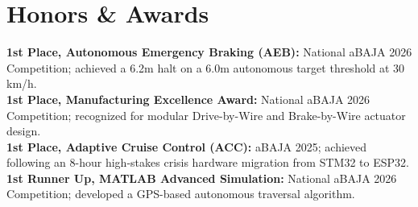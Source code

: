 \documentclass[letterpaper,9pt]{extarticle}
\newcommand{\resumeSubHeadingListStart}{\begin{itemize}[leftmargin=0.08in, label={}]}
\newcommand{\resumeSubHeadingListEnd}{\end{itemize}\vspace{-5pt}}
\begin{document}
\section{Honors \& Awards}
  \vspace{1pt}
  \resumeSubHeadingListStart
    \small{\item{
        \textbf{1st Place, Autonomous Emergency Braking (AEB):}{ National aBAJA 2026 Competition; achieved a 6.2m halt on a 6.0m autonomous target threshold at 30 km/h.} \\ \vspace{1.5pt}
        \textbf{1st Place, Manufacturing Excellence Award:}{ National aBAJA 2026 Competition; recognized for modular Drive-by-Wire and Brake-by-Wire actuator design.} \\ \vspace{1.5pt}
        \textbf{1st Place, Adaptive Cruise Control (ACC):}{ aBAJA 2025; achieved following an 8-hour high-stakes crisis hardware migration from STM32 to ESP32.} \\ \vspace{1.5pt}
        \textbf{1st Runner Up, MATLAB Advanced Simulation:}{ National aBAJA 2026 Competition; developed a GPS-based autonomous traversal algorithm.}
    }}
  \resumeSubHeadingListEnd
\end{document}
